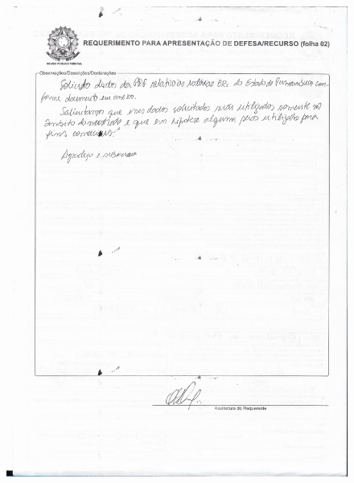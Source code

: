 \begin{figure}[ht!]
		\includegraphics[scale=0.25]{Figuras/Anexos/A1-PRFDadospg_002.pdf}
		\qquad \quad \quad

\end{figure}
